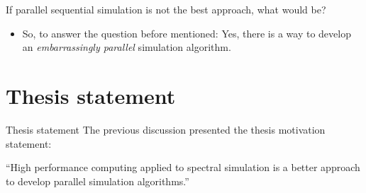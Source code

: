 \begin{frame}{If parallel sequential simulation is not the best approach, what would be?}
	\begin{itemize}
    	\item So, to answer the question before mentioned: Yes, there is a way to develop an \textit{embarrassingly parallel} simulation algorithm. 
    \end{itemize}
\end{frame}


\section {Thesis statement}
\begin{frame}{Thesis statement}
The previous discussion presented the thesis motivation statement:


\begin{block}{}
``High performance computing applied to spectral simulation is a better approach to develop parallel simulation algorithms.''
\end{block}

\end{frame}
